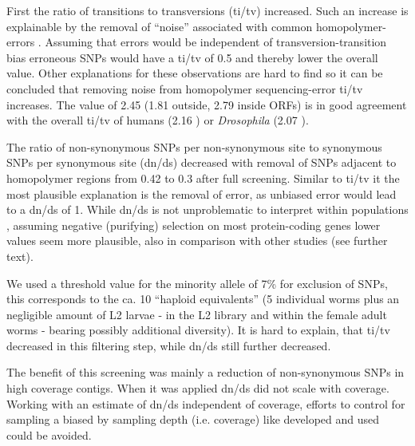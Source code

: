\documentclass[10pt]{bmc_article}
\newenvironment{bmcformat}{\begin{raggedright}\baselineskip20pt\sloppy\setboolean{publ}{false}}{\end{raggedright}\baselineskip20pt\sloppy}
\begin{document}
\begin{bmcformat}
First the ratio of transitions to transversions (ti/tv) increased.
Such an increase is explainable by the removal of ``noise'' associated
with common homopolymer-errors \cite{pmid21685085}. Assuming that
errors would be independent of transversion-transition bias erroneous
SNPs would have a ti/tv of 0.5 and thereby lower the overall
value. Other explanations for these observations are hard to find so
it can be concluded that removing noise from homopolymer
sequencing-error ti/tv increases.  The value of 2.45
(1.81 outside,
2.79 inside ORFs) is in good agreement with
the overall ti/tv of humans (2.16 \cite{pmid21169219}) or
\textit{Drosophila} (2.07 \cite{pmid21143862}). 

The ratio of non-synonymous SNPs per non-synonymous site to synonymous
SNPs per synonymous site (dn/ds) decreased with removal of SNPs
adjacent to homopolymer regions from 0.42 to
0.3 after full screening. Similar to ti/tv it the most
plausible explanation is the removal of error, as unbiased error would
lead to a dn/ds of 1. While dn/ds is not unproblematic to interpret
within populations \cite{pmid19081788}, assuming negative (purifying)
selection on most protein-coding genes lower values seem more
plausible, also in comparison with other studies (see further text).

We used a threshold value for the minority allele of 7\% for exclusion
of SNPs, this corresponds to the ca. 10 ``haploid equivalents'' (5
individual worms plus an negligible amount of L2 larvae - in the L2
library and within the female adult worms - bearing possibly
additional diversity). It is hard to explain, that ti/tv decreased in
this filtering step, while dn/ds still further decreased.

The benefit of this screening was mainly a reduction of non-synonymous
SNPs in high coverage contigs. When it was applied dn/ds did not
scale with coverage. Working with an estimate of dn/ds independent of
coverage, efforts to control for sampling a biased by sampling depth
(i.e. coverage) like developed \cite{pmid18590545} and used
\cite{pmid20478048} could be avoided.  


\end{bmcformat}
\end{document}
